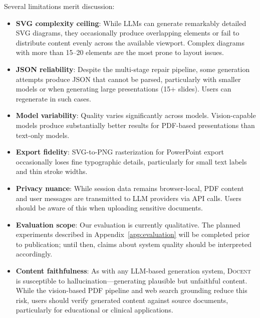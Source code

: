 \documentclass[11pt,a4paper]{article}
\newcommand{\system}{\textsc{Docent}\xspace}
\begin{document}
Several limitations merit discussion:

\begin{itemize}[leftmargin=*,nosep]
    \item \textbf{SVG complexity ceiling}: While LLMs can generate remarkably detailed SVG diagrams, they occasionally produce overlapping elements or fail to distribute content evenly across the available viewport. Complex diagrams with more than 15--20 elements are the most prone to layout issues.
    \item \textbf{JSON reliability}: Despite the multi-stage repair pipeline, some generation attempts produce JSON that cannot be parsed, particularly with smaller models or when generating large presentations (15+ slides). Users can regenerate in such cases.
    \item \textbf{Model variability}: Quality varies significantly across models. Vision-capable models produce substantially better results for PDF-based presentations than text-only models.
    \item \textbf{Export fidelity}: SVG-to-PNG rasterization for PowerPoint export occasionally loses fine typographic details, particularly for small text labels and thin stroke widths.
    \item \textbf{Privacy nuance}: While session data remains browser-local, PDF content and user messages are transmitted to LLM providers via API calls. Users should be aware of this when uploading sensitive documents.
    \item \textbf{Evaluation scope}: Our evaluation is currently qualitative. The planned experiments described in Appendix~\ref{app:evaluation} will be completed prior to publication; until then, claims about system quality should be interpreted accordingly.
    \item \textbf{Content faithfulness}: As with any LLM-based generation system, \system is susceptible to hallucination---generating plausible but unfaithful content. While the vision-based PDF pipeline and web search grounding reduce this risk, users should verify generated content against source documents, particularly for educational or clinical applications.
\end{itemize}
\end{document}
